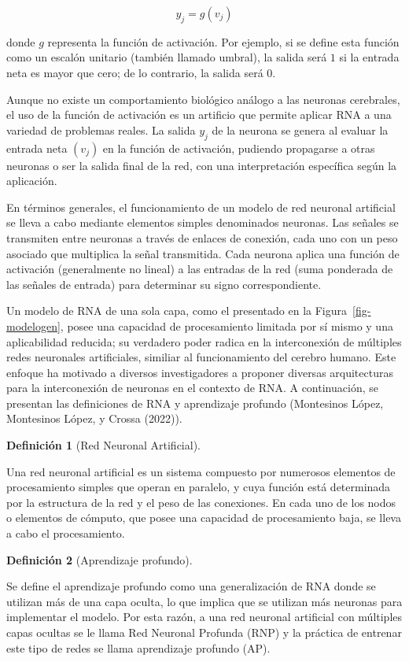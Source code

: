 \documentclass[
  us-letterpaper,
]{scrreprt}
\theoremstyle{plain}
\theoremstyle{definition}
\theoremstyle{plain}
\theoremstyle{definition}
\newtheorem{definition}{Definición}[chapter]
\theoremstyle{remark}
\begin{document}
\[
y_j=g(v_j)
\]

donde \(g\) representa la función de activación. Por ejemplo, si se
define esta función como un escalón unitario (también llamado umbral),
la salida será \(1\) si la entrada neta es mayor que cero; de lo
contrario, la salida será \(0\).

Aunque no existe un comportamiento biológico análogo a las neuronas
cerebrales, el uso de la función de activación es un artificio que
permite aplicar RNA a una variedad de problemas reales. La salida
\(y_j\) de la neurona se genera al evaluar la entrada neta \((v_j)\) en
la función de activación, pudiendo propagarse a otras neuronas o ser la
salida final de la red, con una interpretación específica según la
aplicación.

En términos generales, el funcionamiento de un modelo de red neuronal
artificial se lleva a cabo mediante elementos simples denominados
neuronas. Las señales se transmiten entre neuronas a través de enlaces
de conexión, cada uno con un peso asociado que multiplica la señal
transmitida. Cada neurona aplica una función de activación (generalmente
no lineal) a las entradas de la red (suma ponderada de las señales de
entrada) para determinar su signo correspondiente.

Un modelo de RNA de una sola capa, como el presentado en la
Figura~\ref{fig-modelogen}, posee una capacidad de procesamiento
limitada por sí mismo y una aplicabilidad reducida; su verdadero poder
radica en la interconexión de múltiples redes neuronales artificiales,
similiar al funcionamiento del cerebro humano. Este enfoque ha motivado
a diversos investigadores a proponer diversas arquitecturas para la
interconexión de neuronas en el contexto de RNA. A continuación, se
presentan las definiciones de RNA y aprendizaje profundo (Montesinos
López, Montesinos López, y Crossa (2022)).

\begin{definition}[Red Neuronal
Artificial]\protect\hypertarget{def-ANN}{}\label{def-ANN}

Una red neuronal artificial es un sistema compuesto por numerosos
elementos de procesamiento simples que operan en paralelo, y cuya
función está determinada por la estructura de la red y el peso de las
conexiones. En cada uno de los nodos o elementos de cómputo, que posee
una capacidad de procesamiento baja, se lleva a cabo el procesamiento.

\end{definition}

\begin{definition}[Aprendizaje
profundo]\protect\hypertarget{def-AP}{}\label{def-AP}

Se define el aprendizaje profundo como una generalización de RNA donde
se utilizan más de una capa oculta, lo que implica que se utilizan más
neuronas para implementar el modelo. Por esta razón, a una red neuronal
artificial con múltiples capas ocultas se le llama Red Neuronal Profunda
(RNP) y la práctica de entrenar este tipo de redes se llama aprendizaje
profundo (AP).

\end{definition}
\end{document}
